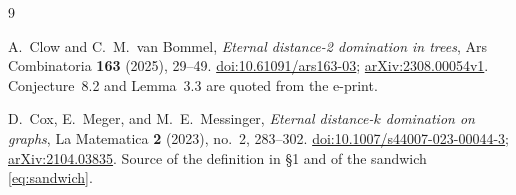 \documentclass[11pt]{amsart}
\begin{document}
\begin{thebibliography}{9}

A.~Clow and C.~M.\ van Bommel,
\emph{Eternal distance-2 domination in trees},
Ars Combinatoria \textbf{163} (2025), 29--49.
\href{https://doi.org/10.61091/ars163-03}{doi:10.61091/ars163-03};
\href{https://arxiv.org/abs/2308.00054v1}{arXiv:2308.00054v1}.
Conjecture~8.2 and Lemma~3.3 are quoted from the e-print.

D.~Cox, E.~Meger, and M.~E.\ Messinger,
\emph{Eternal distance-$k$ domination on graphs},
La Matematica \textbf{2} (2023), no.~2, 283--302.
\href{https://doi.org/10.1007/s44007-023-00044-3}{doi:10.1007/s44007-023-00044-3};
\href{https://arxiv.org/abs/2104.03835}{arXiv:2104.03835}.
Source of the definition in \S1 and of the sandwich \eqref{eq:sandwich}.

\end{thebibliography}
\end{document}
